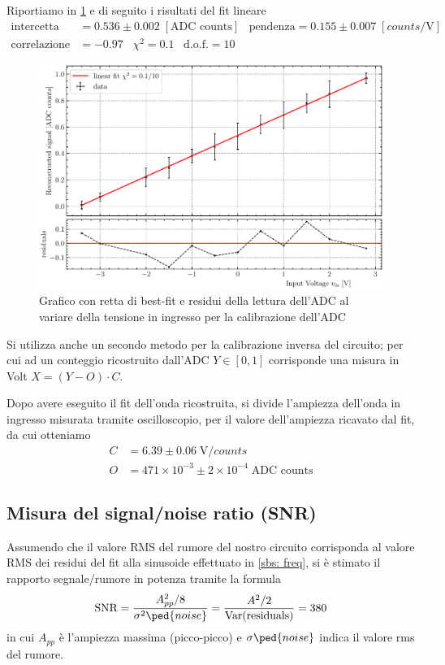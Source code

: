 \documentclass[10pt, a4paper, italian]{article}
\begin{document}
Riportiamo in \cref{fig: cal} e di seguito i risultati del fit lineare
\begin{align*}
\mathrm{intercetta} &= 0.536 \pm 0.002 \; [\text{ADC counts}] \;\;\;
\mathrm{pendenza} = 0.155 \pm 0.007 \; [\si{counts/\V}] \\
\mathrm{correlazione} &= -0.97 \;\;\; \chi^2 = 0.1 \;\;\; \text{d.o.f.} = 10
\end{align*}

\begin{figure}[htbp]
    \centering
	\includegraphics[width=\textwidth]{cal}
    \caption{Grafico con retta di best-fit e residui della lettura dell'ADC
    al variare della tensione in ingresso per la calibrazione dell'ADC
    \label{fig: cal}}
\end{figure}

Si utilizza anche un secondo metodo per la calibrazione inversa del circuito;
per cui ad un conteggio ricostruito dall'ADC $Y \in [0, 1]$ corrisponde una
misura in Volt $X = (Y - O) \cdot C$.

Dopo avere eseguito il fit dell'onda ricostruita, si divide l'ampiezza
dell'onda in ingresso misurata tramite oscilloscopio, per il valore
dell'ampiezza ricavato dal fit, da cui otteniamo
\begin{align*}
C &= 6.39 \pm 0.06 \; \si{\V/counts} \\
O &= 471 \times 10^{-3} \pm 2 \times 10^{-4} \; \text{ADC counts}
\end{align*}

\subsection{Misura del signal/noise ratio (SNR)}
Assumendo che il valore RMS del rumore del nostro circuito corrisponda al
valore RMS dei residui del fit alla sinusoide effettuato in \cref{sbs: freq},
si è stimato il rapporto segnale/rumore in potenza tramite la formula
\begin{equation}\label{eq: SNR}
\text{SNR} = \frac{A_{pp}^2/8}{\sigma^2\ped{noise}} =
\frac{A^2/2}{\text{Var}(\text{residuals})} = 380
\end{equation}
in cui $A_{pp}$ è l'ampiezza massima (picco-picco) e $\sigma\ped{noise}$ indica
il valore rms del rumore.
\end{document}
